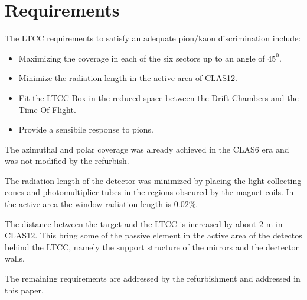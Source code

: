\section{Requirements}


The LTCC requirements to satisfy an adequate pion/kaon discrimination include:


\begin{itemize}
	\item Maximizing the coverage in each of the six sectors up to an angle of $45^0$.
	\item Minimize the radiation length in the active area of CLAS12.
	\item Fit the LTCC Box in the reduced space between the Drift Chambers and the Time-Of-Flight.
	\item Provide a sensibile response to pions.
\end{itemize}

The azimuthal and polar coverage was already achieved in the CLAS6 era and was not modified by the refurbish.

The radiation length of the detector was minimized by placing the light collecting cones and photomultiplier tubes
in the regions obscured by the magnet coils. In the active area the window radiation length is $0.02\%$.

The distance between the target and the LTCC is increased by about $2$ m in CLAS12. This bring some of the passive
element in the active area of the detectos behind the LTCC, namely the support structure of the mirrors and the
dectector walls.

The remaining requirements are addressed by the refurbishment and addressed in this paper.
